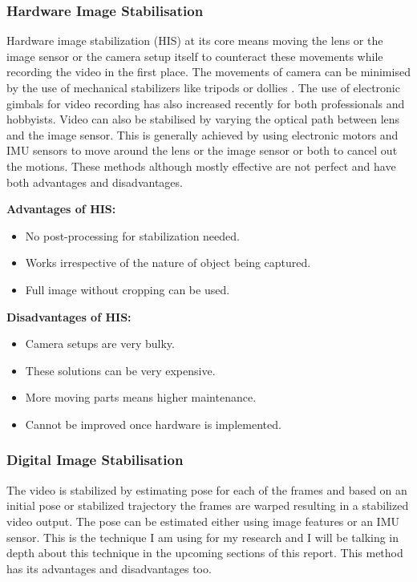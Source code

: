 \subsubsection{Hardware Image Stabilisation}
Hardware image stabilization (HIS) at its core means moving the lens or the image sensor or the camera setup itself to counteract these movements while recording the video in the first place. The movements of camera can be minimised by the use of mechanical stabilizers like tripods or dollies \citep{5995525}. The use of electronic gimbals for video recording has also increased recently for both professionals and hobbyists. Video can also be stabilised by varying the optical path between lens and the image sensor. This is generally achieved by using electronic motors and IMU sensors to move around the lens or the image sensor or both to cancel out the motions. These methods although mostly effective are not perfect and have both advantages and disadvantages.

\textbf{Advantages of HIS: }

\begin{itemize}
\item No post-processing for stabilization needed.
\item Works irrespective of the nature of object being captured.
\item Full image without cropping can be used.
\end{itemize}

\textbf{Disadvantages of HIS:}
\begin{itemize}
\item Camera setups are very bulky.
\item These solutions can be very expensive.
\item More moving parts means higher maintenance.
\item Cannot be improved once hardware is implemented.
\end{itemize}

\subsubsection{Digital Image Stabilisation}
The video is stabilized by estimating pose for each of the frames and based on an initial pose or stabilized trajectory the frames are warped resulting in a stabilized video output. The pose can be estimated either using image features or an IMU sensor. This is the technique I am using for my research and I will be talking in depth about this technique in the upcoming sections of this report. This method has its advantages and disadvantages too. 

